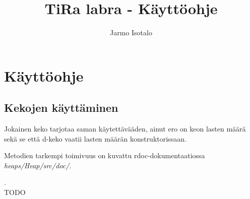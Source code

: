 \documentclass[a4paper,12pt]{article}
\begin{document}
\title{TiRa labra - Käyttöohje} 
\author{Jarmo Isotalo}
\maketitle

\section{Käyttöohje}

\subsection{Kekojen käyttäminen}
Jokainen keko tarjotaa saman käytettävääden, ainut ero on keon lasten määrä sekä se että d-keko vaatii lasten määrän konstruktorissaan.


Metodien tarkempi toimivuus on kuvattu rdoc-dokumentaatiossa \emph{heaps/Heap/src/doc/}.

.\\TODO
\end{document}
